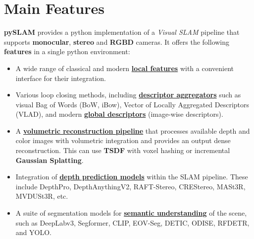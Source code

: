 \documentclass{article}
\begin{document}
\section{Main Features}\label{main-features}

\textbf{pySLAM} provides a python implementation of a \emph{Visual SLAM} pipeline that supports \textbf{monocular}, \textbf{stereo} and
\textbf{RGBD} cameras. It offers the following \textbf{features} in a single python environment: 

\begin{itemize}
    \item A wide range of classical and modern
    \textbf{\protect\hyperlink{supported-local-features}{local features}}
    with a convenient interface for their integration. 
    
    \item Various loop closing methods, including
    \textbf{\protect\hyperlink{supported-global-descriptors-and-local-descriptor-aggregation-methods}{descriptor
    aggregators}} such as visual Bag of Words (BoW\cite{galvez2012bags}, iBow\cite{garcia2018ibow}), Vector of Locally
    Aggregated Descriptors (VLAD\cite{jegou2010aggregating}), and modern
    \textbf{\protect\hyperlink{supported-global-descriptors-and-local-descriptor-aggregation-methods}{global
    descriptors}} (image-wise descriptors).
    
    \item A
    \textbf{\protect\hyperlink{volumetric-reconstruction}{volumetric
    reconstruction pipeline}} that processes available depth and color
    images with volumetric integration and provides an output dense
    reconstruction. This can use \textbf{TSDF}\cite{dong2022ash} with voxel hashing or
    incremental \textbf{Gaussian Splatting}\cite{matsuki2023gaussian,kerbl20233d}.
    
    \item Integration of
    \textbf{\protect\hyperlink{depth-prediction}{depth prediction models}}
    within the SLAM pipeline. These include DepthPro\cite{depthpro2023}, DepthAnythingV2\cite{depthanythingv2_2024},
    RAFT-Stereo\cite{teed2021raft}, CREStereo\cite{li2022cres}, MASt3R\cite{master}, MVDUSt3R\cite{mvduster}, etc.

    \item A suite of segmentation models for
    \textbf{\protect\hyperlink{semantic-mapping}{semantic understanding}} of
    the scene, such as DeepLabv3\cite{chen2017rethinking}, Segformer\cite{xie2021segformer}, CLIP\cite{lin2023clip}, EOV-Seg\cite{eov_seg}, DETIC\cite{detic}, ODISE\cite{odise}, RFDETR\cite{rfdetr}, and YOLO\cite{redmon2016yolo,redmon2017yolo9000,redmon2018yolov3,bochkovskiy2020yolov4,jocher2020yolov5, wang2022yolov7, jocher2023yolov8, sapkota2025ultralytics}.
    

\end{itemize}
\end{document}
